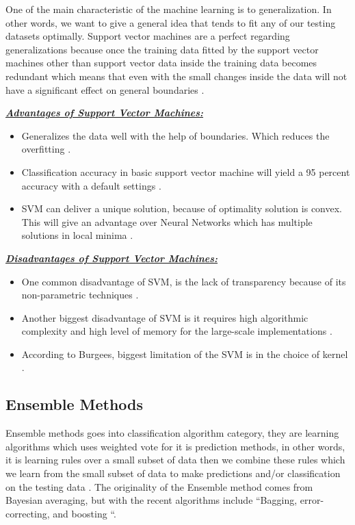 \documentclass[sigconf]{acmart}
\begin{document}
\par One of the main characteristic of the machine learning is to generalization. In other words, we want to give a general idea that tends to fit any of our testing datasets optimally. Support vector machines are a perfect regarding generalizations because once the training data fitted by the support vector machines other than support vector data inside the training data becomes redundant which means that even with the small changes inside the data will not have a significant effect on general boundaries \cite{www-simafore-svm}. 

\textbf{\underline{\textit{Advantages of Support Vector Machines:}}} 
\begin{itemize}
\item Generalizes the data well with the help of boundaries. Which reduces the overfitting \cite{www-simafore-svm}.
\item Classification accuracy in basic support vector machine will yield a 95 percent accuracy with a default settings \cite{www-simafore-svm}. 
\item SVM can deliver a unique solution, because of optimality solution is convex. This will give an advantage over Neural Networks which has multiple solutions in local minima \cite{berlin-svm}.
\end{itemize}

\textbf{\underline{\textit{Disadvantages of Support Vector Machines:}}}

\begin{itemize}
\item One common disadvantage of SVM, is the lack of transparency because of its non-parametric techniques \cite{berlin-svm}.
\item Another biggest disadvantage of SVM is it requires high algorithmic complexity and high level of memory for the large-scale implementations \cite{verma-ssv}. 
\item According to Burgees, biggest limitation of the SVM is in the choice of kernel \cite{Burges1998}.
\end{itemize}

\subsection{Ensemble Methods}
Ensemble methods goes into classification algorithm category, they are learning algorithms which uses weighted vote for it is prediction methods, in other words, it is learning rules over a small subset of data then we combine these rules which we learn from the small subset of data to make predictions and/or classification on the testing data \cite{dietterich-ensemble}. The originality of the Ensemble method comes from Bayesian averaging, but with the recent algorithms include ``Bagging, error-correcting, and boosting \cite{dietterich-ensemble}``. 
\end{document}
